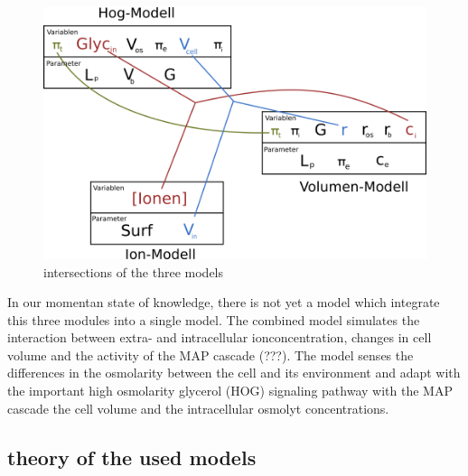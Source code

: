 \begin{figure}[h!]
	\begin{center}
		\begin{minipage}{0,8\textwidth}
			
			\includegraphics[width=\textwidth]{picture/model_intersections.png}
			\caption{intersections of the three models } 
			\label{IntersectionsOfTheModels} 
		\end{minipage}
	\end{center}
\end{figure}

In our momentan state of knowledge, there is not yet a model which integrate this three modules into a single model. The combined model simulates the interaction between extra- and intracellular ionconcentration, changes in cell volume and the activity of the MAP cascade (???). The model senses the differences in the osmolarity between the cell and its environment and adapt with the important high osmolarity glycerol (HOG) signaling pathway with the MAP cascade the cell volume and the intracellular osmolyt concentrations. 

\subsection{theory of the used models}
